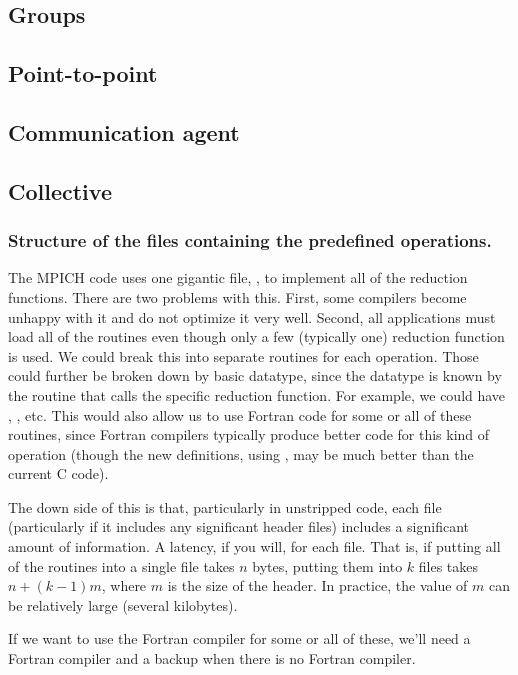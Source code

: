 \documentclass{article}
\begin{document}
\subsection{Groups}
\subsection{Point-to-point}  
\subsection{Communication agent}
\subsection{Collective}  

\subsubsection{Structure of the files containing the predefined operations.}

The MPICH code uses one gigantic file, , to implement
all of the reduction functions.  There are two problems with this.
First, some compilers become unhappy with it and do not optimize it
very well.  Second, all applications must load all of the routines
even though only a few (typically one) reduction function is used.  We
could break this into separate routines for each operation.  Those
could further be broken down by basic datatype, since the datatype is
known by the routine that calls the specific reduction function.  
For example, we could have ,
, etc.  This would also allow us to use Fortran
code for some or all of these routines, since Fortran compilers
typically produce better code for this kind of operation (though the
new definitions, using , may be much better than the
current C code).

The down side of this is that, particularly in unstripped code, each
file (particularly if it includes any significant header files)
includes a significant amount of information.  A latency, if you will,
for each file.  That is, if putting all of the routines into a single
file takes $n$ bytes, putting them into $k$ files takes $n + (k-1)m$,
where $m$ is the size of the header.  In practice, the value of $m$ can be
relatively large (several kilobytes).

If we want to use the Fortran compiler for some or all of these, we'll
need a Fortran compiler and a backup when there is no Fortran compiler.
\end{document}
